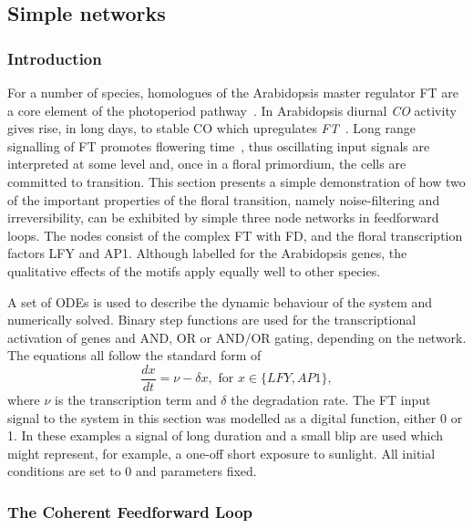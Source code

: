 \subsection{Simple networks}\label{sec:simpleNets}
\subsubsection{Introduction}

For a number of species, homologues of the Arabidopsis master regulator FT are a core element of the photoperiod pathway~\cite{higgins2010,tamaki2007}.
In Arabidopsis diurnal \emph{CO} activity gives rise, in long days, to stable CO which upregulates \emph{FT}~\cite{samach2000,valverde2004}.
Long range signalling of FT promotes flowering time~\cite{corbesier2007,mathieu2007,jaeger2007}, thus oscillating input signals are interpreted at some level and, once in a floral primordium, the cells are committed to transition.
This section presents a simple demonstration of how two of the important properties of the floral transition, namely noise-filtering and irreversibility, can be exhibited by simple three node networks in feedforward loops.
The nodes consist of the complex FT with FD, and the floral transcription factors LFY and AP1.
Although labelled for the Arabidopsis genes, the qualitative effects of the motifs apply equally well to other species.

A set of ODEs is used to describe the dynamic behaviour of the system and numerically solved.
Binary step functions are used for the transcriptional activation of genes and AND, OR or AND/OR gating, depending on the network.
The equations all follow the standard form of
\begin{equation*}
\frac{dx}{dt}= \nu - \delta x, \text{ for } x\in \{LFY,AP1\},
\end{equation*}
where $\nu$ is the transcription term and $\delta$ the degradation rate.
The FT input signal to the system in this section was modelled as a digital function, either 0 or 1.
In these examples a signal of long duration and a small blip are used which might represent, for example, a one-off short exposure to sunlight.
All initial conditions are set to $0$ and parameters fixed.

\subsubsection{The Coherent Feedforward Loop}

